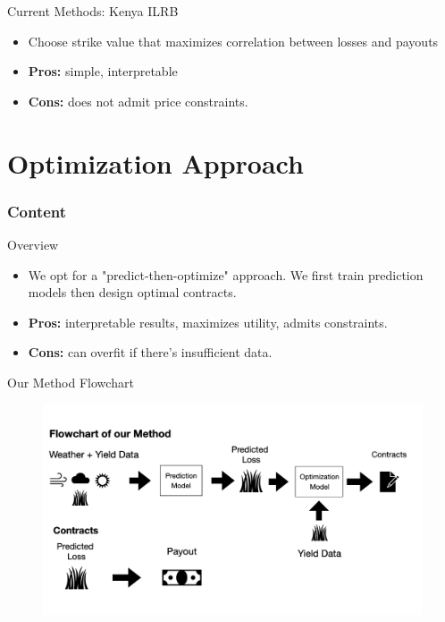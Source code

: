 \documentclass{beamer}
\begin{document}
\begin{frame}{Current Methods: Kenya ILRB}
    \begin{itemize}
        \setlength\itemsep{1em}
        \item Choose strike value that maximizes correlation between losses and payouts  
        \item \textbf{Pros:} simple, interpretable
        \item \textbf{Cons:} does not admit price constraints. 
    \end{itemize}
    \end{frame}


\section{Optimization Approach}
\begin{frame}
    \frametitle{Content}
    \tableofcontents[currentsection]
  \end{frame}

  \begin{frame}{Overview}
    \begin{itemize}
        \setlength\itemsep{2em}
        \item We opt for a "predict-then-optimize" approach. We first train prediction models then design optimal contracts. 
        \item \textbf{Pros:} interpretable results, maximizes utility, admits constraints.
        \item \textbf{Cons:} can overfit if there's insufficient data. 
    \end{itemize}
\end{frame}

\begin{frame}{Our Method Flowchart}
    \begin{figure}
        \includegraphics[width=\textwidth]{../../../output/figures/Our Method Flowchart.png}
    \end{figure}
\end{frame}
\end{document}
